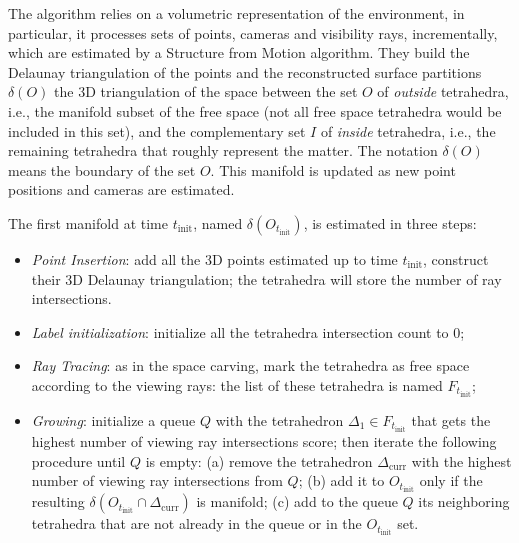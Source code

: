 The algorithm relies on a volumetric representation of the environment, in particular, it processes sets of points, cameras and visibility rays, incrementally, which are estimated by a Structure from Motion algorithm. 
They build the Delaunay triangulation of the points and the reconstructed surface partitions $\delta( O)$ the 3D triangulation of the space between the set $O$ of \emph{outside} tetrahedra, i.e., the manifold subset of the free space (not all free space tetrahedra would be included in this set), and the complementary set $I$ of \emph{inside} tetrahedra, i.e., the remaining tetrahedra that roughly represent the matter. The notation $\delta( O)$ means the boundary  of the set $O$.
This manifold is updated as new point positions and cameras are estimated. 

The first manifold at time $t_{\text{init}}$,  named $\delta( O_{t_{\text{init}}})$, is estimated in three steps:
\begin{itemize}
  \item \emph{Point Insertion}: add all the 3D points estimated up to time $t_{\text{init}}$, construct their 3D Delaunay triangulation; the tetrahedra will store the number of ray intersections.
  \item \emph{Label initialization}: initialize all the tetrahedra intersection count to $0$;
  \item \emph{Ray Tracing}: as in the space carving, mark the tetrahedra as free space according to the viewing rays: the list of these tetrahedra is named $F_{t_{\text{init}}}$;
  \item \emph{Growing}: initialize a queue $Q$ with the tetrahedron $\Delta_1 \in F_{t_{\text{init}}}$ that gets the highest number of viewing ray intersections score; then iterate the following procedure until $Q$ is empty: (a) remove the tetrahedron $\Delta_{\text{curr}}$ with the highest number of viewing ray intersections from $Q$; (b) add it to $O_{t_{\text{init}}}$ only if the resulting $\delta (O_{t_{\text{init}}} \cap \Delta_{\text{curr}})$  is manifold; (c) add to the queue $Q$ its neighboring tetrahedra that are not already in the queue or in the $O_{t_{\text{init}}}$ set. 
\end{itemize}

